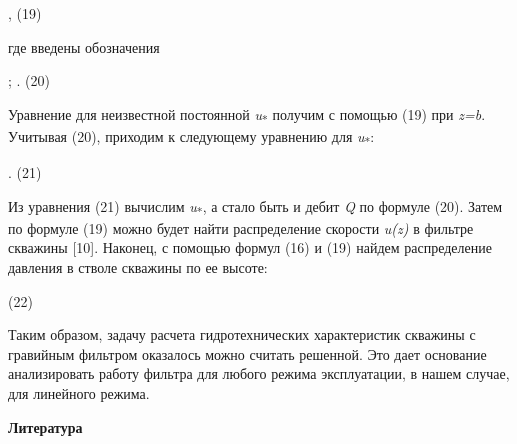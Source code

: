 \begin{multicols}{2}
,
(19)

где введены обозначения

;
.
(20)

Уравнение для неизвестной постоянной \emph{u}\textsubscript{*} получим с
помощью (19) при \emph{z=b}. Учитывая (20), приходим к следующему
уравнению для \emph{u}\textsubscript{*}:



.
(21)

Из уравнения (21) вычислим \emph{u}\textsubscript{*}, а стало быть и
дебит \emph{Q} по формуле (20). Затем по формуле (19) можно будет найти
распределение скорости \emph{u(z)} в фильтре скважины {[}10{]}. Наконец,
с помощью формул (16) и (19) найдем распределение давления в стволе
скважины по ее высоте:


(22)

Таким образом, задачу расчета гидротехнических характеристик скважины с
гравийным фильтром оказалось можно считать решенной. Это дает основание
анализировать работу фильтра для любого режима эксплуатации, в нашем
случае, для линейного режима.
\end{multicols}

\begin{center}
{\bfseries Литература}
\end{center}

